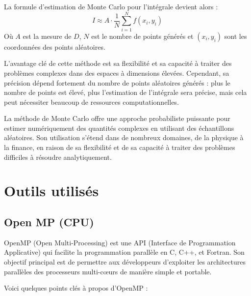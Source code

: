 \documentclass[10pt,a4paper]{article}
\begin{document}
La formule d'estimation de Monte Carlo pour l'intégrale devient alors :
$$I \approx A \cdot \frac{1}{N} \sum_{i=1}^{N} f(x_i, y_i)$$
Où $A$ est la mesure de $D$, $N$ est le nombre de points générés et $(x_i, y_i)$ sont les coordonnées des points aléatoires.

L'avantage clé de cette méthode est sa flexibilité et sa capacité à traiter des problèmes complexes dans des espaces à dimensions élevées. Cependant, sa précision dépend fortement du nombre de points aléatoires générés : plus le nombre de points est élevé, plus l'estimation de l'intégrale sera précise, mais cela peut nécessiter beaucoup de ressources computationnelles.

La méthode de Monte Carlo offre une approche probabiliste puissante pour estimer numériquement des quantités complexes en utilisant des échantillons aléatoires. Son utilisation s'étend dans de nombreux domaines, de la physique à la finance, en raison de sa flexibilité et de sa capacité à traiter des problèmes difficiles à résoudre analytiquement.


\section{Outils utilisés}

\subsection{Open MP (CPU)}

OpenMP (Open Multi-Processing) est une API (Interface de Programmation Applicative) qui facilite la programmation parallèle en C, C++, et Fortran. Son objectif principal est de permettre aux développeurs d'exploiter les architectures parallèles des processeurs multi-cœurs de manière simple et portable.

Voici quelques points clés à propos d'OpenMP :
\end{document}
